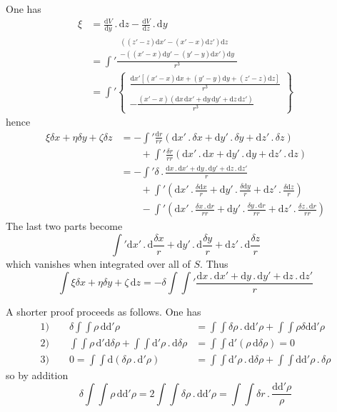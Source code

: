 One has
\[
\begin{aligned}
\xi&=\frac{\mathrm dV}{\mathrm dy}\,.\,\mathrm dz-\frac{\mathrm dV}{\mathrm dz}\,.\,\mathrm dy\\[4pt]
&=\int'\frac{\begin{gathered}((z'-z)\mathrm dx'-(x'-x)\mathrm dz')\mathrm dz\\-((x'-x)\mathrm dy'-(y'-y)\mathrm dx')\mathrm dy\end{gathered}}{r^3}\\[4pt]
&=\int'\left\{\begin{gathered}\frac{\mathrm dx'[(x'-x)\mathrm dx+(y'-y)\mathrm dy+(z'-z)\mathrm dz]}{r^3}\\-\frac{(x'-x)(\mathrm dx\,\mathrm dx'+\mathrm dy\,\mathrm dy'+\mathrm dz\,\mathrm dz')}{r^3}\end{gathered}\right\}
\end{aligned}
\]
hence
\[
\begin{aligned}
\xi\delta x+\eta\delta y+\zeta\delta z&=-\int'\frac{\mathrm dr}{rr}(\mathrm dx'\,.\,\delta x+\mathrm dy'\,.\,\delta y+\mathrm dz'\,.\,\delta z)\\
&\qquad+\int'\frac{\delta r}{rr}(\mathrm dx'\,.\,\mathrm dx+\mathrm dy'\,.\,\mathrm dy+\mathrm dz'\,.\,\mathrm dz)\\
&=-\int'\delta\,.\,\frac{\mathrm dx\,.\,\mathrm dx'+\mathrm dy\,.\,\mathrm dy'+\mathrm dz\,.\,\mathrm dz'}{r}\\
&\qquad+\int'\left(\mathrm dx'\,.\,\frac{\delta\mathrm dx}{r}+\mathrm dy'\,.\,\frac{\delta\mathrm dy}{r}+\mathrm dz'\,.\,\frac{\delta\mathrm dz}{r}\right)\\
&\qquad-\int'\left(\mathrm dx'\,.\,\frac{\delta x\,.\,\mathrm dr}{rr}+\mathrm dy'\,.\,\frac{\delta y\,.\,\mathrm dr}{rr}+\mathrm dz'\,.\,\frac{\delta z\,.\,\mathrm dr}{rr}\right)
\end{aligned}
\]
The last two parts become
\[
\int'\mathrm dx'\,.\,\mathrm d\frac{\delta x}{r}+\mathrm dy'\,.\,\mathrm d\frac{\delta y}{r}+\mathrm dz'\,.\,\mathrm d\frac{\delta z}{r}
\]
which vanishes when integrated over all of $S$. Thus
\[
\int\xi\delta x+\eta\delta y+\zeta\,\mathrm dz=-\delta\int\int'\frac{\mathrm dx\,.\,\mathrm dx'+\mathrm dy\,.\,\mathrm dy'+\mathrm dz\,.\,\mathrm dz'}{r}
\]

A shorter proof proceeds as follows. One has
\[
\begin{aligned}
\text{1)}\qquad\delta\int\int\rho\,\mathrm d\mathrm d'\rho&=\int\int\delta\rho\,.\,\mathrm d\mathrm d'\rho+\int\int\rho\delta\mathrm d\mathrm d'\rho\\[4pt]
\text{2)}\qquad\int\int\rho\,\mathrm d'\mathrm d\delta\rho+\int\int\mathrm d'\rho\,.\,\mathrm d\delta\rho&=\int\int\mathrm d'(\rho\,\mathrm d\delta\rho)=0\\[4pt]
\text{3)}\qquad0=\int\int\mathrm d(\delta\rho\,.\,\mathrm d'\rho)&=\int\int\mathrm d'\rho\,.\,\mathrm d\delta\rho+\int\int\mathrm d\mathrm d'\rho\,.\,\delta\rho
\end{aligned}
\]
so by addition
\[
\delta\int\int\rho\,\mathrm d\mathrm d'\rho=2\int\int\delta\rho\,.\,\mathrm d\mathrm d'\rho=\int\int\delta r\,.\,\frac{\mathrm d\mathrm d'\rho}{\rho}
\]

